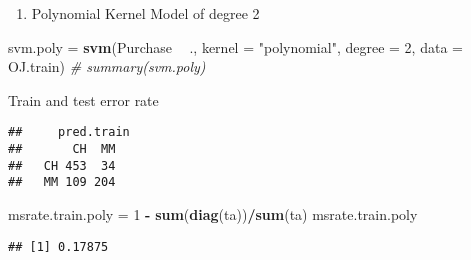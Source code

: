 \documentclass[]{article}
\newenvironment{Shaded}{\begin{snugshade}}{\end{snugshade}}
\newcommand{\CommentTok}[1]{\textcolor[rgb]{0.56,0.35,0.01}{\textit{#1}}}
\newcommand{\DataTypeTok}[1]{\textcolor[rgb]{0.13,0.29,0.53}{#1}}
\newcommand{\DecValTok}[1]{\textcolor[rgb]{0.00,0.00,0.81}{#1}}
\newcommand{\KeywordTok}[1]{\textcolor[rgb]{0.13,0.29,0.53}{\textbf{#1}}}
\newcommand{\NormalTok}[1]{#1}
\newcommand{\OperatorTok}[1]{\textcolor[rgb]{0.81,0.36,0.00}{\textbf{#1}}}
\newcommand{\StringTok}[1]{\textcolor[rgb]{0.31,0.60,0.02}{#1}}
\providecommand{\tightlist}{%
  \setlength{\itemsep}{0pt}\setlength{\parskip}{0pt}}
\begin{document}
\begin{enumerate}
\def\labelenumi{(\alph{enumi})}
\setcounter{enumi}{6}
\tightlist
\item
  Polynomial Kernel Model of degree 2
\end{enumerate}

\begin{Shaded}
\begin{Highlighting}[]
\NormalTok{svm.poly =}\StringTok{ }\KeywordTok{svm}\NormalTok{(Purchase }\OperatorTok{~}\StringTok{ }\NormalTok{., }\DataTypeTok{kernel =} \StringTok{"polynomial"}\NormalTok{, }\DataTypeTok{degree =} \DecValTok{2}\NormalTok{, }\DataTypeTok{data =}\NormalTok{ OJ.train)}
\CommentTok{# summary(svm.poly)}
\end{Highlighting}
\end{Shaded}

Train and test error rate

\begin{Shaded}
\end{Shaded}

\begin{verbatim}
##     pred.train
##       CH  MM
##   CH 453  34
##   MM 109 204
\end{verbatim}

\begin{Shaded}
\begin{Highlighting}[]
\NormalTok{msrate.train.poly =}\StringTok{ }\DecValTok{1} \OperatorTok{-}\StringTok{ }\KeywordTok{sum}\NormalTok{(}\KeywordTok{diag}\NormalTok{(ta))}\OperatorTok{/}\KeywordTok{sum}\NormalTok{(ta)}
\NormalTok{msrate.train.poly}
\end{Highlighting}
\end{Shaded}

\begin{verbatim}
## [1] 0.17875
\end{verbatim}

\begin{Shaded}
\end{Shaded}
\end{document}
